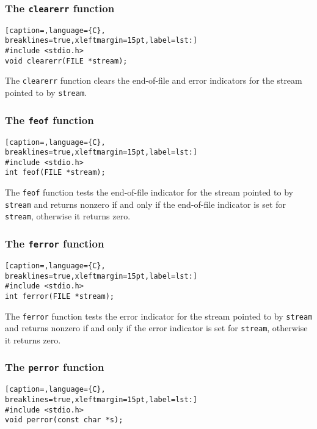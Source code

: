 \subsubsection{The \texttt{clearerr} function}
\lstset{basicstyle=\scriptsize, numbers=left, captionpos=b, tabsize=4}
\begin{lstlisting}[caption=,language={C},
breaklines=true,xleftmargin=15pt,label=lst:]
#include <stdio.h>
void clearerr(FILE *stream);
\end{lstlisting}

The \texttt{clearerr} function clears the end-of-file and error indicators for
the stream pointed to by \texttt{stream}.

\subsubsection{The \texttt{feof} function}
\lstset{basicstyle=\scriptsize, numbers=left, captionpos=b, tabsize=4}
\begin{lstlisting}[caption=,language={C},
breaklines=true,xleftmargin=15pt,label=lst:]
#include <stdio.h>
int feof(FILE *stream);
\end{lstlisting}

The \texttt{feof} function tests the end-of-file indicator for the stream
pointed to by \texttt{stream} and returns nonzero if and only if the
end-of-file indicator is set for \texttt{stream}, otherwise it returns zero.

\subsubsection{The \texttt{ferror} function}
\lstset{basicstyle=\scriptsize, numbers=left, captionpos=b, tabsize=4}
\begin{lstlisting}[caption=,language={C},
breaklines=true,xleftmargin=15pt,label=lst:]
#include <stdio.h>
int ferror(FILE *stream);
\end{lstlisting}

The \texttt{ferror} function tests the error indicator for the stream pointed
to by \texttt{stream} and returns nonzero if and only if the error indicator is
set for \texttt{stream}, otherwise it returns zero.

\subsubsection{The \texttt{perror} function}
\lstset{basicstyle=\scriptsize, numbers=left, captionpos=b, tabsize=4}
\begin{lstlisting}[caption=,language={C},
breaklines=true,xleftmargin=15pt,label=lst:]
#include <stdio.h>
void perror(const char *s);
\end{lstlisting}

